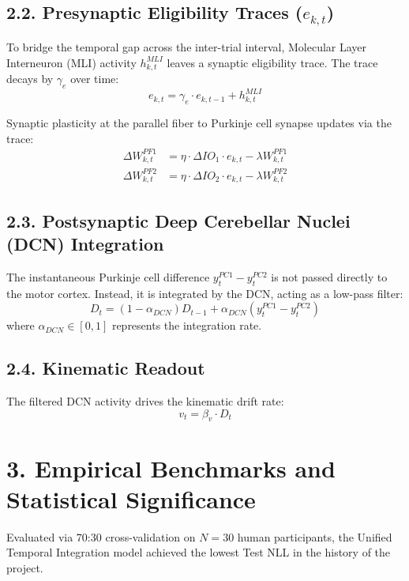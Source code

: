 \documentclass[11pt,twoside,a4paper]{article}
\begin{document}
\subsection{2.2. Presynaptic Eligibility Traces ($e_{k,t}$)}
To bridge the temporal gap across the inter-trial interval, Molecular Layer Interneuron (MLI) activity $h^{MLI}_{k, t}$ leaves a synaptic eligibility trace. The trace decays by $\gamma_e$ over time:
\begin{equation}
    e_{k, t} = \gamma_e \cdot e_{k, t-1} + h^{MLI}_{k, t}
\end{equation}

Synaptic plasticity at the parallel fiber to Purkinje cell synapse updates via the trace:
\begin{align}
    \Delta W^{PF1}_{k, t} &= \eta \cdot \Delta IO_1 \cdot e_{k, t} - \lambda W^{PF1}_{k, t} \\
    \Delta W^{PF2}_{k, t} &= \eta \cdot \Delta IO_2 \cdot e_{k, t} - \lambda W^{PF2}_{k, t}
\end{align}

\subsection{2.3. Postsynaptic Deep Cerebellar Nuclei (DCN) Integration}
The instantaneous Purkinje cell difference $y^{PC1}_t - y^{PC2}_t$ is not passed directly to the motor cortex. Instead, it is integrated by the DCN, acting as a low-pass filter:
\begin{equation}
    D_t = (1 - \alpha_{DCN}) D_{t-1} + \alpha_{DCN} (y^{PC1}_t - y^{PC2}_t)
\end{equation}
where $\alpha_{DCN} \in [0, 1]$ represents the integration rate.

\subsection{2.4. Kinematic Readout}
The filtered DCN activity drives the kinematic drift rate:
\begin{equation}
    v_t = \beta_v \cdot D_t
\end{equation}

\section{3. Empirical Benchmarks and Statistical Significance}
Evaluated via 70:30 cross-validation on $N=30$ human participants, the Unified Temporal Integration model achieved the lowest Test NLL in the history of the project.
\end{document}
